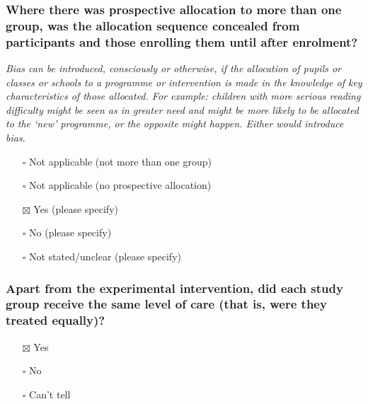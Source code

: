 \documentclass[
  doc, a4paper]{apa7}
\providecommand{\tightlist}{%
  \setlength{\itemsep}{0pt}\setlength{\parskip}{0pt}}
\begin{document}
\subsubsection{Where there was prospective allocation to more than one group, was the allocation sequence concealed from participants and those enrolling them until after enrolment?}\label{where-there-was-prospective-allocation-to-more-than-one-group-was-the-allocation-sequence-concealed-from-participants-and-those-enrolling-them-until-after-enrolment}

\emph{Bias can be introduced, consciously or otherwise, if the allocation of pupils or classes or schools to a programme or intervention is made in the knowledge of key characteristics of those allocated. For example: children with more serious reading difficulty might be seen as in greater need and might be more likely to be allocated to the `new' programme, or the opposite might happen. Either would introduce bias.}

\begin{itemize}
\tightlist
\item[$\square$]
  Not applicable (not more than one group)\\
\item[$\square$]
  Not applicable (no prospective allocation)\\
\item[$\boxtimes$]
  Yes (please specify)\\
\item[$\square$]
  No (please specify)\\
\item[$\square$]
  Not stated/unclear (please specify)
\end{itemize}

\subsubsection{Apart from the experimental intervention, did each study group receive the same level of care (that is, were they treated equally)?}\label{apart-from-the-experimental-intervention-did-each-study-group-receive-the-same-level-of-care-that-is-were-they-treated-equally}

\begin{itemize}
\tightlist
\item[$\boxtimes$]
  Yes
\item[$\square$]
  No
\item[$\square$]
  Can't tell
\end{itemize}
\end{document}
